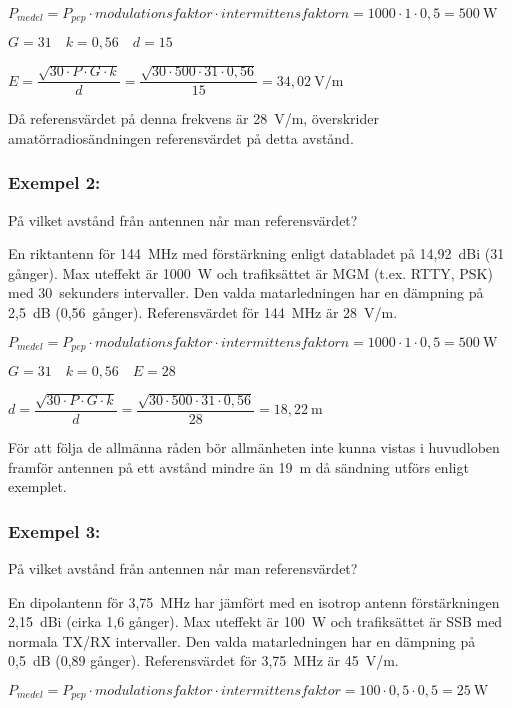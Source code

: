 \(P_{medel} = P_{pep} \cdot modulationsfaktor \cdot intermittensfaktorn
= 1000 \cdot 1 \cdot 0,5 = 500\ \mathrm{W}\)

\(G = 31 \quad k = 0,56 \quad d = 15\)

\(E = \dfrac{\sqrt{30 \cdot P \cdot G \cdot k}}{d}
= \dfrac{\sqrt{30 \cdot 500 \cdot 31 \cdot 0,56}}{15}
= 34,02\ \mathrm{V/m}\)

Då referensvärdet på denna frekvens är 28~V/m, överskrider
amatörradiosändningen referensvärdet på detta avstånd.

\subsubsection{Exempel 2:}

På vilket avstånd från antennen når man referensvärdet?

En riktantenn för 144~MHz med förstärkning enligt databladet på
14,92~dBi (31 gånger).
Max uteffekt är 1000~W och trafiksättet är MGM (t.ex. RTTY, PSK) med
30~sekunders intervaller.
Den valda matarledningen har en dämpning på 2,5~dB (0,56~gånger).
Referensvärdet för 144~MHz är 28~V/m.

\(P_{medel} = P_{pep} \cdot modulationsfaktor \cdot intermittensfaktorn
= 1000 \cdot 1 \cdot 0,5 = 500\ \mathrm{W}\)

\(G = 31 \quad k = 0,56 \quad E = 28\)

\(d = \dfrac{\sqrt{30 \cdot P \cdot G \cdot k}}{d}
= \dfrac{\sqrt{30 \cdot 500 \cdot 31 \cdot 0,56}}{28}
= 18,22\ \mathrm{m}\)

För att följa de allmänna råden bör allmänheten inte kunna vistas i huvudloben
framför antennen på ett avstånd mindre än 19~m då sändning utförs enligt
exemplet.

\subsubsection{Exempel 3:}

På vilket avstånd från antennen når man referensvärdet?

En dipolantenn för 3,75~MHz har jämfört med en isotrop antenn förstärkningen
2,15~dBi (cirka 1,6 gånger).
Max uteffekt är 100~W och trafiksättet är SSB med normala TX/RX intervaller.
Den valda matarledningen har en dämpning på 0,5~dB (0,89 gånger).
Referensvärdet för 3,75~MHz är 45~V/m.

\(P_{medel} = P_{pep} \cdot modulationsfaktor \cdot intermittensfaktor
= 100 \cdot 0,5 \cdot 0,5 = 25\ \mathrm{W}\)

